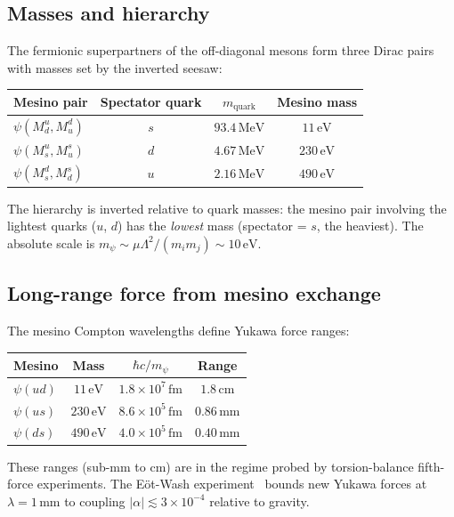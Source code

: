 \documentclass[12pt,a4paper]{article}
\newcommand{\MeV}{\,\text{MeV}}
\newcommand{\eV}{\,\text{eV}}
\begin{document}
\subsection{Masses and hierarchy}

The fermionic superpartners of the off-diagonal mesons form three
Dirac pairs with masses set by the inverted seesaw:

\begin{center}
\begin{tabular}{lccc}
\toprule
Mesino pair & Spectator quark & $m_{\text{quark}}$ & Mesino mass \\
\midrule
$\psi(M^u_d, M^d_u)$ & $s$ & $93.4\MeV$ & $11\eV$ \\
$\psi(M^u_s, M^s_u)$ & $d$ & $4.67\MeV$ & $230\eV$ \\
$\psi(M^d_s, M^s_d)$ & $u$ & $2.16\MeV$ & $490\eV$ \\
\bottomrule
\end{tabular}
\end{center}

The hierarchy is inverted relative to quark masses: the mesino pair
involving the lightest quarks ($u$, $d$) has the \emph{lowest} mass
(spectator = $s$, the heaviest).  The absolute scale is
$m_\psi \sim \mu \Lambda^2 / (m_i m_j) \sim 10\eV$.

\subsection{Long-range force from mesino exchange}

The mesino Compton wavelengths define Yukawa force ranges:
\begin{center}
\begin{tabular}{lccc}
\toprule
Mesino & Mass & $\hbar c / m_\psi$ & Range \\
\midrule
$\psi(ud)$ & $11\eV$ & $1.8 \times 10^7\,\text{fm}$ & $1.8\,\text{cm}$ \\
$\psi(us)$ & $230\eV$ & $8.6 \times 10^5\,\text{fm}$ & $0.86\,\text{mm}$ \\
$\psi(ds)$ & $490\eV$ & $4.0 \times 10^5\,\text{fm}$ & $0.40\,\text{mm}$ \\
\bottomrule
\end{tabular}
\end{center}

These ranges (sub-mm to cm) are in the regime probed by torsion-balance
fifth-force experiments.  The E\"ot-Wash experiment~\cite{Kapner2007}
bounds new Yukawa forces at $\lambda = 1\,\text{mm}$ to coupling
$|\alpha| \lesssim 3 \times 10^{-4}$ relative to gravity.
\end{document}
